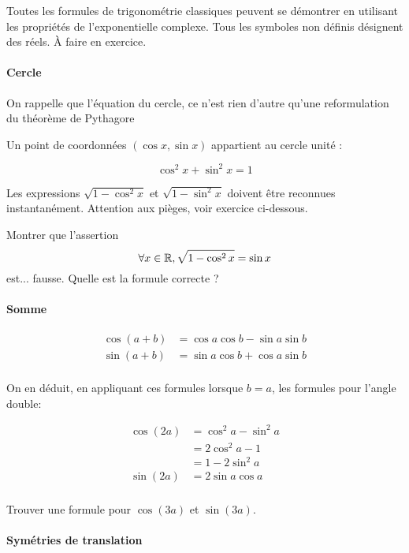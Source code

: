 Toutes les formules de trigonométrie classiques peuvent se démontrer en utilisant les propriétés de l'exponentielle complexe. Tous les symboles non définis désignent des réels. À faire en exercice.

\paragraph{Cercle}
\begin{remarque}
On rappelle que l'équation du cercle, ce n'est rien d'autre qu'une reformulation du théorème de Pythagore
\end{remarque}
Un point de coordonnées $(\cos x,\sin x)$ appartient au cercle unité :

\[ \cos^2x+\sin^2x = 1\]
\begin{remarque}
Les expressions $\sqrt{1-\cos^2 x}$ et $\sqrt{1 - \sin^2 x}$ doivent être reconnues instantanément. Attention aux pièges, voir exercice ci-dessous.
\end{remarque}
\begin{exo}
Montrer que l'assertion
\[ \forall x\in \mathbb{R}, \sqrt{1-\cos^2 x} = \sin x\]
est... fausse. Quelle est la formule correcte ?
\end{exo}


\paragraph{Somme}

\begin{align*}
\cos(a+b) &= \cos a \cos b - \sin a \sin b\\
\sin(a+b )&= \sin a \cos b + \cos a \sin b\\
\end{align*}

On en déduit, en appliquant ces formules lorsque $b=a$, les formules pour l'angle double:

\begin{align*}
\cos(2a) &= \cos^2 a - \sin^2 a \\
&= 2\cos^2 a-1 \\
&= 1-2\sin^2 a\\
\sin(2a)&= 2\sin a \cos a \\
\end{align*}

\begin{exo}
Trouver une formule pour $\cos(3a)$ et $\sin(3a)$.
\end{exo}

\paragraph{Symétries de translation}

